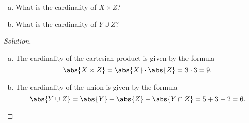 \documentclass[12pt]{amsart}
\begin{document}
\begin{thm}[20 Points]\label{ex5}
  \begin{enumerate}[(a)]
  \item
    What is the cardinality of $X \times Z$?
  \item
    What is the cardinality of $Y \cup Z$?
  \end{enumerate}
  
  \begin{proof}[Solution]
    \begin{enumerate}[(a)]
    \item
      The cardinality of the cartesian product is given by the formula
      $$\abs{X \times Z} = \abs{X} \cdot \abs{Z} = 3 \cdot 3 = 9.$$
    \item
      The cardinality of the union is given by the formula
      $$\abs{Y \cup Z} = \abs{Y} + \abs{Z} - \abs{Y \cap Z} = 5 + 3 - 2 = 6.$$
    \end{enumerate}
  \end{proof}
\end{thm}

\newpage
\end{document}
